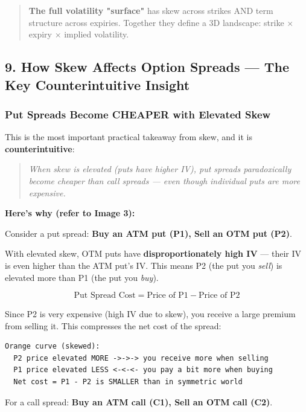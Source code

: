 \documentclass[12pt,openany]{book}
\begin{document}
\begin{quote}
\textbf{The full volatility "surface"} has skew across strikes AND term structure across expiries. Together they define a 3D landscape: strike \(\times\) expiry \(\times\) implied volatility.
\end{quote}

\subsection{9. How Skew Affects Option Spreads — The Key Counterintuitive Insight}

\subsubsection{Put Spreads Become CHEAPER with Elevated Skew}

This is the most important practical takeaway from skew, and it is \textbf{counterintuitive}:

\begin{quote}
\emph{When skew is elevated (puts have higher IV), put spreads paradoxically become }\emph{cheaper}\emph{ than call spreads — even though individual puts are more expensive.}
\end{quote}

\textbf{Here's why (refer to Image 3):}

Consider a put spread: \textbf{Buy an ATM put (P1), Sell an OTM put (P2)}.

With elevated skew, OTM puts have \textbf{disproportionately high IV} — their IV is even higher than the ATM put's IV. This means P2 (the put you \emph{sell}) is elevated more than P1 (the put you \emph{buy}).

\[
\text{Put Spread Cost} = \text{Price of P1} - \text{Price of P2}
\]

Since P2 is very expensive (high IV due to skew), you receive a large premium from selling it. This compresses the net cost of the spread:

\begin{center}
\begin{Verbatim}[fontsize=\small,breaklines=true]
Orange curve (skewed):
  P2 price elevated MORE ->->-> you receive more when selling
  P1 price elevated LESS <-<-<- you pay a bit more when buying
  Net cost = P1 - P2 is SMALLER than in symmetric world
\end{Verbatim}
\end{center}

For a call spread: \textbf{Buy an ATM call (C1), Sell an OTM call (C2)}.
\end{document}
